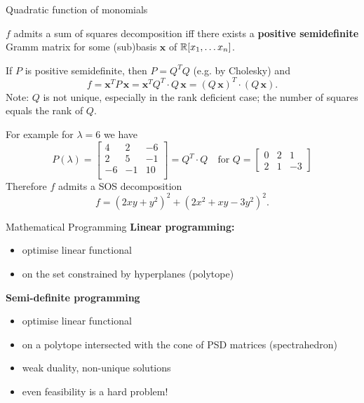 \begin{frame}{Quadratic function of monomials}

     \begin{lemma}
     $f$ admits a sum of squares decomposition iff there exists a \textbf{positive semidefinite} Gramm matrix for some (sub)basis $\mathbf{x}$ of $\mathbb{R}[x_1, \ldots x_n]$.
   \end{lemma}
   \pause
     If $P$ is positive semidefinite, then $P = Q^TQ$ (e.g. by Cholesky) and
   \[f = \mathbf{x}^T P\, \mathbf{x}
       = \mathbf{x}^T Q^T \cdot Q\, \mathbf{x}
       = \left(Q\, \mathbf{x}\right)^T \cdot\left(Q\,  \mathbf{x}\right).\]
  \pause
  Note: $Q$ is not unique, especially in the rank deficient case; the number of squares equals the rank of $Q$.
  \pause
  \begin{example}
  For example for $\lambda = 6$ we have
  \[
    P(\lambda) = \begin{bmatrix}
      4  &  2 & -6\\
      2  &  5 & -1\\
      -6 & -1 & 10\\
    \end{bmatrix} = Q^T \cdot Q \quad \text{for }
    Q = \begin{bmatrix}
      0 & 2 &  1\\
      2 & 1 & -3
    \end{bmatrix}
  \]
  Therefore $f$ admits a SOS decomposition
  \[f = \left( 2xy + y^2 \right)^2 + \left(2x^2 + xy - 3y^2 \right)^2.\]
  \end{example}

\end{frame}

\begin{frame}{Mathematical Programming}
\textbf{Linear programming:}
\begin{itemize}
   \item optimise linear functional
   \item on the set constrained by hyperplanes (polytope)
\end{itemize}
\pause

\textbf{Semi-definite programming}
\begin{itemize}
   \item optimise linear functional
   \item on a polytope intersected with the cone of PSD matrices (spectrahedron)
   \item weak duality, non-unique solutions
   \item even feasibility is a hard problem!
\end{itemize}

\end{frame}

